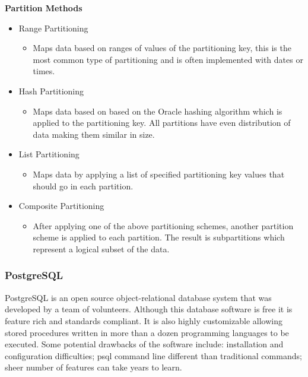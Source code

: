 \documentclass[draftclsnofoot, onecolumn, compsoc, 10pt]{IEEEtran}
\begin{document}
\textbf{Partition Methods}
\begin{itemize} 
	\item  Range Partitioning
    \begin{itemize} 
		\item Maps data based on ranges of values of the partitioning key, this is the most common type of partitioning and is often implemented with dates or times.
    \end{itemize}
    \item Hash Partitioning
    \begin{itemize} 
		\item Maps data based on based on the Oracle hashing algorithm which is applied to the partitioning key.
        All partitions have even distribution of data making them similar in size.
    \end{itemize}
    \item List Partitioning
    \begin{itemize} 
		\item Maps data by applying a list of specified partitioning key values that should go in each partition.
    \end{itemize}
    \item Composite Partitioning
    \begin{itemize} 
		\item After applying one of the above partitioning schemes, another partition scheme is applied to each partition.
        The result is subpartitions which represent a logical subset of the data.
    \end{itemize}
\end{itemize}
\subsubsection{PostgreSQL}
PostgreSQL is an open source object-relational database system that was developed by a team of volunteers.
Although this database software is free it is feature rich and standards compliant.
It is also highly customizable allowing stored procedures written in more than a dozen programming languages to be executed.
Some potential drawbacks of the software include: installation and configuration difficulties; psql command line different than traditional commands; sheer number of features can take years to learn.
\end{document}
